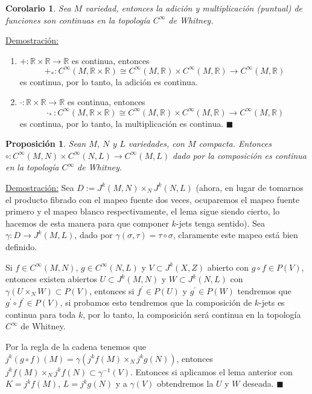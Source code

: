\documentclass{report}
\newtheorem{prop}[theorem]{Proposici\'on}
\newtheorem{coro}[theorem]{Corolario}
\theoremstyle{definition}
\begin{document}
\begin{coro}
Sea $M$ variedad, entonces la adici\'on y multiplicaci\'on (puntual) de funciones son continuas en la topolog\'ia $C^\infty$ de Whitney.

\end{coro}
\underline{Demostraci\'on:}
\begin{enumerate}

\item $+: \mathbb{R} \times \mathbb{R} \to \mathbb{R}$ es continua, entonces $$+_\ast : C^\infty(M,\mathbb{R} \times \mathbb{R} ) \cong C^\infty(M, \mathbb{R}) \times C^\infty (M , \mathbb{R}) \to C^\infty (M , \mathbb{R})$$ es continua, por lo tanto, la adici\'on es continua.
\item $\cdot: \mathbb{R} \times \mathbb{R} \to \mathbb{R}$ es continua, entonces $$\cdot_\ast : C^\infty(M,\mathbb{R} \times \mathbb{R} ) \cong C^\infty(M, \mathbb{R}) \times C^\infty (M , \mathbb{R}) \to C^\infty (M , \mathbb{R})$$ es continua, por lo tanto, la multiplicaci\'on es continua. $\blacksquare$
\end{enumerate}

\begin{prop}
Sean $M$, $N$ y $L$ variedades, con $M$ compacta. Entonces $\circ: C^\infty (M,N) \times C^\infty (N,L) \to C^\infty (M,L)$ dado por la composici\'on es continua en la topolog\'ia $C^\infty $ de Whitney.
\end{prop}
\underline{Demostraci\'on:} Sea $D:= J^k (M,N) \times_N J^k(N,L)$ (ahora, en lugar de tomarnos el producto fibrado con el mapeo fuente dos veces, ocuparemos el mapeo fuente primero y el mapeo blanco respectivamente, el lema sigue siendo cierto, lo hacemos de esta manera para que componer $k$-jets tenga sentido). Sea $\gamma: D \to J^k (M,L)$, dado por $\gamma (\sigma, \tau) = \tau \circ \sigma$, claramente este mapeo est\'a bien definido. 

Si $f \in C^\infty (M,N)$, $g \in C^\infty (N,L)$ y $V \subset J^k (X, Z)$ abierto con $g \circ f \in  P(V)$, entonces existen abiertos $U \subset J^k (M,N)$ y $W \subset J^k (N,L)$ con $\gamma (U \times_N W) \subset P(V)$, entonces si $f^\prime \in P(U)$ y $g^\prime \in P(W)$ tendremos que $g^\prime \circ f^\prime \in P(V)$, si probamos esto tendremos que la composici\'on de $k$-jets es continua para toda $k$, por lo tanto, la composici\'on ser\'a continua en la topolog\'ia $C^\infty$ de Whitney.

Por la regla de la cadena tenemos que $j^k (g \circ f) (M) = \gamma ( j^k f(M) \times_N j^k g(N))$, entonces $j^k f(M) \times_N j^k f(N) \subset \gamma^{-1} (V)$. Entonces si aplicamos el lema anterior con $K= j^k f(M)$, $L= j^k g(N)$ y a $\gamma(V)$ obtendremos la $U$ y $W$ deseada. $\blacksquare$
\end{document}
